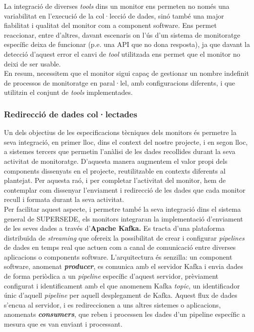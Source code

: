 La integració de diverses \textit{tools} dins un monitor ens permeten no només una variabilitat en l'execució de la col·lecció de dades, sinó també una major fiabilitat i qualitat del monitor com a component software. Ens permet reaccionar, entre d'altres, davant escenaris on l'ús d'un sistema de monitoratge específic deixa de funcionar (p.e. una API que no dona resposta), ja que davant la detecció d'aquest error el canvi de \textit{tool} utilitzada ens permet que el monitor no deixi de ser usable.\\

En resum, necessitem que el monitor sigui capaç de gestionar un nombre indefinit de processos de monitoratge en paral·lel, amb configuracions diferents, i que utilitzin el conjunt de \textit{tools} implementades.

\subsubsection{Redirecció de dades col·lectades}

Un dels objectius de les especificacions tècniques dels monitors és permetre la seva integració, en primer lloc, dins el context del nostre projecte, i en segon lloc, a sistemes tercers que permetin l'anàlisi de les dades recollides durant la seva activitat de monitoratge. D'aquesta manera augmentem el valor propi dels components dissenyats en el projecte, reutilitzable en contexts diferents al plantejat. Per aquesta raó, i per completar l'activitat del monitor, hem de contemplar com dissenyar l'enviament i redirecció de les dades que cada monitor recull i formata durant la seva activitat. \\

Per facilitar aquest aspecte, i permetre també la seva integració dins el sistema general de SUPERSEDE, els monitors integraran la implementació d'enviament de les seves dades a través d'\textbf{Apache Kafka.} Es tracta d'una plataforma distribuïda de \textit{streaming} que ofereix la possibilitat de crear i configurar \textit{pipelines} de dades en temps real que actuen com a canal de comunicació entre diverses aplicacions o components software. L'arquitectura és senzilla: un component software, anomenat \textbf{\textit{producer}}, es comunica amb el servidor Kafka i envia dades de forma periòdica a un \textit{pipeline} específic d'aquest servidor, prèviament configurat i identificament amb el que anomenem Kafka \textit{topic}, un identificador únic d'aquell \textit{pipeline} per aquell desplegament de Kafka. Aquest flux de dades s'encua al servidor, i es redireccionen a uns altres sistemes o aplicacions, anomenats \textbf{\textit{consumers}}, que reben i processen les dades d'un pipeline específic a mesura que es van enviant i processant.\\

